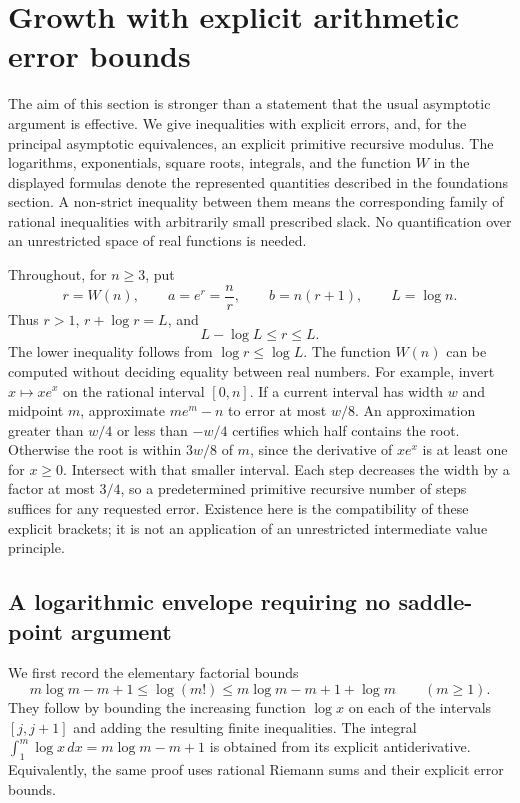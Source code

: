 \section{Growth with explicit arithmetic error bounds}
\label{sec:growth}

The aim of this section is stronger than a statement that the usual
asymptotic argument is effective.  We give inequalities with explicit
errors, and, for the principal asymptotic equivalences, an explicit
primitive recursive modulus.  The logarithms, exponentials, square roots,
integrals, and the function $W$ in the displayed formulas denote the
represented quantities described in the foundations section.  A
non-strict inequality between them means the corresponding family of
rational inequalities with arbitrarily small prescribed slack.  No
quantification over an unrestricted space of real functions is needed.

Throughout, for $n\geq3$, put
\[
 r=W(n),\qquad a=e^r=\frac nr,\qquad
 b=n(r+1),\qquad L=\log n.
\]
Thus $r>1$, $r+\log r=L$, and
\begin{equation}\label{eq:growth-r-bracket}
 L-\log L\leq r\leq L.
\end{equation}
The lower inequality follows from $\log r\leq\log L$.  The function
$W(n)$ can be computed without deciding equality between real numbers.
For example, invert $x\mapsto xe^x$ on the rational interval $[0,n]$.
If a current interval has width $w$ and midpoint $m$, approximate
$me^m-n$ to error at most $w/8$.  An approximation greater than $w/4$
or less than $-w/4$ certifies which half contains the root.  Otherwise
the root is within $3w/8$ of $m$, since the derivative of $xe^x$ is at
least one for $x\geq0$.  Intersect with that smaller interval.  Each
step decreases the width by a factor at most $3/4$, so a predetermined
primitive recursive number of steps suffices for any requested error.
Existence here is the compatibility of these explicit brackets; it is
not an application of an unrestricted intermediate value principle.

\subsection{A logarithmic envelope requiring no saddle-point argument}

We first record the elementary factorial bounds
\begin{equation}\label{eq:elementary-factorial-log}
 m\log m-m+1\leq\log(m!)
 \leq m\log m-m+1+\log m\qquad(m\geq1).
\end{equation}
They follow by bounding the increasing function $\log x$ on each of
the intervals $[j,j+1]$ and adding the resulting finite inequalities.
The integral $\int_1^m\log x\,dx=m\log m-m+1$ is obtained from its
explicit antiderivative.  Equivalently, the same proof uses rational
Riemann sums and their explicit error bounds.

